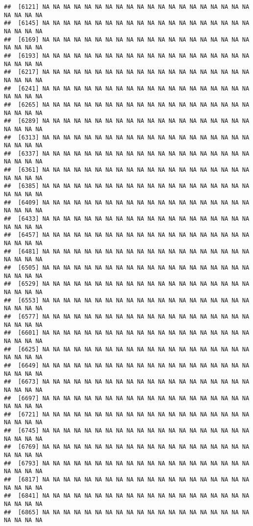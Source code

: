 \documentclass[
]{article}
\begin{document}
\begin{verbatim}
##  [6121] NA NA NA NA NA NA NA NA NA NA NA NA NA NA NA NA NA NA NA NA NA NA NA NA
##  [6145] NA NA NA NA NA NA NA NA NA NA NA NA NA NA NA NA NA NA NA NA NA NA NA NA
##  [6169] NA NA NA NA NA NA NA NA NA NA NA NA NA NA NA NA NA NA NA NA NA NA NA NA
##  [6193] NA NA NA NA NA NA NA NA NA NA NA NA NA NA NA NA NA NA NA NA NA NA NA NA
##  [6217] NA NA NA NA NA NA NA NA NA NA NA NA NA NA NA NA NA NA NA NA NA NA NA NA
##  [6241] NA NA NA NA NA NA NA NA NA NA NA NA NA NA NA NA NA NA NA NA NA NA NA NA
##  [6265] NA NA NA NA NA NA NA NA NA NA NA NA NA NA NA NA NA NA NA NA NA NA NA NA
##  [6289] NA NA NA NA NA NA NA NA NA NA NA NA NA NA NA NA NA NA NA NA NA NA NA NA
##  [6313] NA NA NA NA NA NA NA NA NA NA NA NA NA NA NA NA NA NA NA NA NA NA NA NA
##  [6337] NA NA NA NA NA NA NA NA NA NA NA NA NA NA NA NA NA NA NA NA NA NA NA NA
##  [6361] NA NA NA NA NA NA NA NA NA NA NA NA NA NA NA NA NA NA NA NA NA NA NA NA
##  [6385] NA NA NA NA NA NA NA NA NA NA NA NA NA NA NA NA NA NA NA NA NA NA NA NA
##  [6409] NA NA NA NA NA NA NA NA NA NA NA NA NA NA NA NA NA NA NA NA NA NA NA NA
##  [6433] NA NA NA NA NA NA NA NA NA NA NA NA NA NA NA NA NA NA NA NA NA NA NA NA
##  [6457] NA NA NA NA NA NA NA NA NA NA NA NA NA NA NA NA NA NA NA NA NA NA NA NA
##  [6481] NA NA NA NA NA NA NA NA NA NA NA NA NA NA NA NA NA NA NA NA NA NA NA NA
##  [6505] NA NA NA NA NA NA NA NA NA NA NA NA NA NA NA NA NA NA NA NA NA NA NA NA
##  [6529] NA NA NA NA NA NA NA NA NA NA NA NA NA NA NA NA NA NA NA NA NA NA NA NA
##  [6553] NA NA NA NA NA NA NA NA NA NA NA NA NA NA NA NA NA NA NA NA NA NA NA NA
##  [6577] NA NA NA NA NA NA NA NA NA NA NA NA NA NA NA NA NA NA NA NA NA NA NA NA
##  [6601] NA NA NA NA NA NA NA NA NA NA NA NA NA NA NA NA NA NA NA NA NA NA NA NA
##  [6625] NA NA NA NA NA NA NA NA NA NA NA NA NA NA NA NA NA NA NA NA NA NA NA NA
##  [6649] NA NA NA NA NA NA NA NA NA NA NA NA NA NA NA NA NA NA NA NA NA NA NA NA
##  [6673] NA NA NA NA NA NA NA NA NA NA NA NA NA NA NA NA NA NA NA NA NA NA NA NA
##  [6697] NA NA NA NA NA NA NA NA NA NA NA NA NA NA NA NA NA NA NA NA NA NA NA NA
##  [6721] NA NA NA NA NA NA NA NA NA NA NA NA NA NA NA NA NA NA NA NA NA NA NA NA
##  [6745] NA NA NA NA NA NA NA NA NA NA NA NA NA NA NA NA NA NA NA NA NA NA NA NA
##  [6769] NA NA NA NA NA NA NA NA NA NA NA NA NA NA NA NA NA NA NA NA NA NA NA NA
##  [6793] NA NA NA NA NA NA NA NA NA NA NA NA NA NA NA NA NA NA NA NA NA NA NA NA
##  [6817] NA NA NA NA NA NA NA NA NA NA NA NA NA NA NA NA NA NA NA NA NA NA NA NA
##  [6841] NA NA NA NA NA NA NA NA NA NA NA NA NA NA NA NA NA NA NA NA NA NA NA NA
##  [6865] NA NA NA NA NA NA NA NA NA NA NA NA NA NA NA NA NA NA NA NA NA NA NA NA

\end{verbatim}
\end{document}
